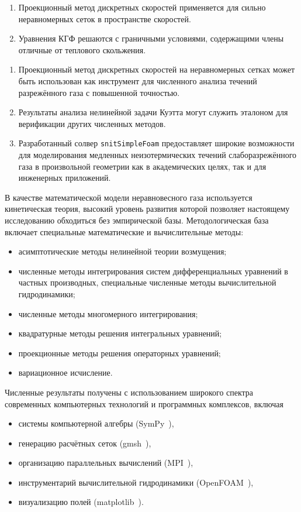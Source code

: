 {\novelty}
\begin{enumerate}
    \item Проекционный метод дискретных скоростей применяется для сильно неравномерных сеток в пространстве скоростей. %
    \item Уравнения КГФ решаются с граничными условиями, содержащими члены отличные от теплового скольжения. %
\end{enumerate}

{\influence}
\begin{enumerate}
    \item Проекционный метод дискретных скоростей на неравномерных сетках может быть использован
    как инструмент для численного анализа течений разрежённого газа с повышенной точностью.
    \item Результаты анализа нелинейной задачи Куэтта могут служить эталоном
    для верификации других численных методов.
    \item Разработанный солвер \verb+snitSimpleFoam+ предоставляет широкие возможности для моделирования медленных
    неизотермических течений слаборазрежённого газа в произвольной геометрии
    как в академических целях, так и для инженерных приложений.
\end{enumerate}

{\methods}
В качестве математической модели неравновесного газа используется кинетическая теория,
высокий уровень развития которой позволяет настоящему исследованию обходиться без эмпирической базы.
Методологическая база включает специальные математические и вычислительные методы:
\begin{itemize}
    \item асимптотические методы нелинейной теории возмущения;
    \item численные методы интегрирования систем дифференциальных уравнений в частных производных,
    специальные численные методы вычислительной гидродинамики;
    \item численные методы многомерного интегрирования;
    \item квадратурные методы решения интегральных уравнений;
    \item проекционные методы решения операторных уравнений;
    \item вариационное исчисление.
\end{itemize}
Численные результаты получены с использованием широкого спектра современных компьютерных технологий и программных комплексов, включая
\begin{itemize}
    \item системы компьютерной алгебры (SymPy~\autocite{sympy}),
    \item генерацию расчётных сеток (gmsh~\autocite{gmsh}),
    \item организацию параллельных вычислений (MPI~\autocite{mpi}),
    \item инструментарий вычислительной гидродинамики (OpenFOAM~\autocite{openfoam}),
    \item визуализацию полей (matplotlib~\autocite{matplotlib}).
\end{itemize}

